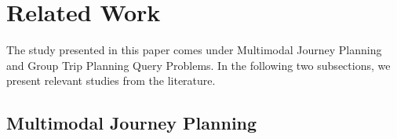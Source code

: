 \section{Related Work}
\label{Sec:RW}
The study presented in this paper comes under Multimodal Journey Planning and Group Trip Planning Query Problems. In the following two subsections, we present relevant studies from the literature.
\subsection{Multimodal Journey Planning}


